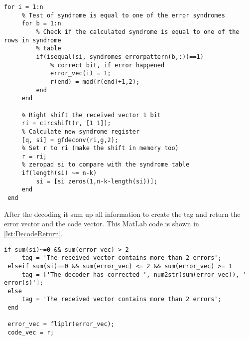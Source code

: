 \documentclass[Main]{subfiles}
\begin{document}
\begin{lstlisting}[caption=Error detection, style=Code-Matlab, label=lst:ErrorDetection]
 for i = 1:n
     % Test of syndrome is equal to one of the error syndromes
     for b = 1:n
         % Check if the calculated syndrome is equal to one of the rows in syndrome
         % table
         if(isequal(si, syndromes_errorpattern(b,:))==1)
             % correct bit, if error happened
             error_vec(i) = 1;
             r(end) = mod(r(end)+1,2);
         end
     end
     
     % Right shift the received vector 1 bit
     ri = circshift(r, [1 1]);
     % Calculate new syndrome register
     [q, si] = gfdeconv(ri,g,2);
     % Set r to ri (make the shift in memory too)
     r = ri;
     % zeropad si to compare with the syndrome table
     if(length(si) ~= n-k)
         si = [si zeros(1,n-k-length(si))];
     end
 end
\end{lstlisting}

After the decoding it sum up all information to create the tag and return the error vector and the code vector.
This MatLab code is shown in \codeTitle \ref{lst:DecodeReturn}.

\begin{lstlisting}[caption=Meggitt decode return, style=Code-Matlab, label=lst:DecodeReturn]
 if sum(si)~=0 && sum(error_vec) > 2
     tag = 'The received vector contains more than 2 errors';
 elseif sum(si)==0 && sum(error_vec) <= 2 && sum(error_vec) >= 1
     tag = ['The decoder has corrected ', num2str(sum(error_vec)), ' error(s)'];
 else
     tag = 'The received vector contains more than 2 errors';
 end
 
 error_vec = fliplr(error_vec);
 code_vec = r;
\end{lstlisting}
\end{document}
